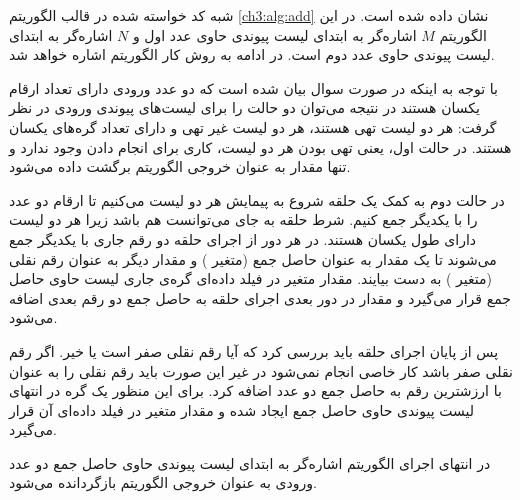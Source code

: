 
شبه کد خواسته شده در قالب الگوریتم {\eqref{ch3:alg:add}} نشان داده شده است. در این الگوریتم {$M$} اشاره‌گر به ابتدای لیست پیوندی حاوی عدد اول و {$N$} اشاره‌گر به ابتدای لیست پیوندی حاوی عدد دوم است. در ادامه به روش کار الگوریتم اشاره خواهد شد.

با توجه به اینکه در صورت سوال بیان شده است که دو عدد ورودی دارای تعداد ارقام یکسان هستند در نتیجه می‌توان دو حالت را برای لیست‌های پیوندی ورودی در نظر گرفت:
 هر دو لیست تهی هستند،
 هر دو لیست غیر تهی و دارای تعداد گره‌های یکسان هستند.
در حالت اول، یعنی تهی بودن هر دو لیست، کاری برای انجام دادن وجود ندارد و تنها مقدار {} به عنوان خروجی الگوریتم برگشت داده می‌شود.

در حالت دوم به کمک یک حلقه شروع به پیمایش هر دو لیست می‌کنیم تا ارقام دو عدد را با یکدیگر جمع کنیم. شرط حلقه‌ به جای
{} می‌توانست {} هم باشد زیرا هر دو لیست دارای طول یکسان هستند. در هر دور از اجرای حلقه دو رقم جاری با یکدیگر جمع می‌شوند تا یک مقدار به عنوان حاصل جمع (متغیر {}) و مقدار دیگر به عنوان رقم نقلی (متغیر {}) به دست بیایند. مقدار متغیر {} در فیلد داده‌‌ای گره‌ی جاری لیست حاوی حاصل جمع قرار می‌گیرد و مقدار {} در دور بعدی اجرای حلقه به حاصل جمع دو رقم بعدی اضافه می‌شود.

پس از پایان اجرای حلقه باید بررسی کرد که آیا رقم نقلی صفر است یا خیر. اگر رقم نقلی صفر باشد کار خاصی انجام نمی‌شود در غیر این صورت باید رقم نقلی را به عنوان با ارزشترین رقم به حاصل جمع دو عدد اضافه کرد. برای این منظور یک گره در انتهای لیست پیوندی حاوی حاصل جمع ایجاد شده و مقدار متغیر {} در فیلد داده‌ای آن قرار می‌گیرد.

در انتهای اجرای الگوریتم اشاره‌گر به ابتدای لیست پیوندی حاوی حاصل جمع دو عدد ورودی به عنوان خروجی الگوریتم بازگردانده می‌شود.


